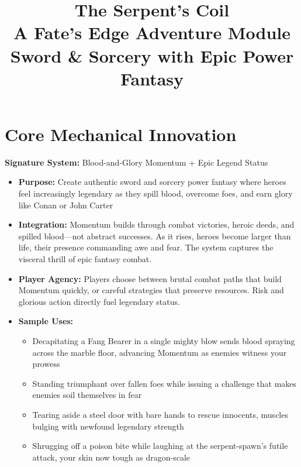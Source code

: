 \documentclass[11pt]{article}
\title{\Huge\textbf{The Serpent's Coil}\\
\Large A Fate's Edge Adventure Module\\
\large Sword \& Sorcery with Epic Power Fantasy}
\author{}
\date{}
\begin{document}
\maketitle


\section{Core Mechanical Innovation}

\textbf{Signature System:} Blood-and-Glory Momentum + Epic Legend Status
\begin{itemize}
\item \textbf{Purpose:} Create authentic sword and sorcery power fantasy where heroes feel increasingly legendary as they spill blood, overcome foes, and earn glory like Conan or John Carter
\item \textbf{Integration:} Momentum builds through combat victories, heroic deeds, and spilled blood—not abstract successes. As it rises, heroes become larger than life, their presence commanding awe and fear. The system captures the visceral thrill of epic fantasy combat.
\item \textbf{Player Agency:} Players choose between brutal combat paths that build Momentum quickly, or careful strategies that preserve resources. Risk and glorious action directly fuel legendary status.
\item \textbf{Sample Uses:}
  \begin{itemize}
  \item Decapitating a Fang Bearer in a single mighty blow sends blood spraying across the marble floor, advancing Momentum as enemies witness your prowess
  \item Standing triumphant over fallen foes while issuing a challenge that makes enemies soil themselves in fear
  \item Tearing aside a steel door with bare hands to rescue innocents, muscles bulging with newfound legendary strength
  \item Shrugging off a poison bite while laughing at the serpent-spawn's futile attack, your skin now tough as dragon-scale
  \end{itemize}
\end{itemize}
\end{document}
